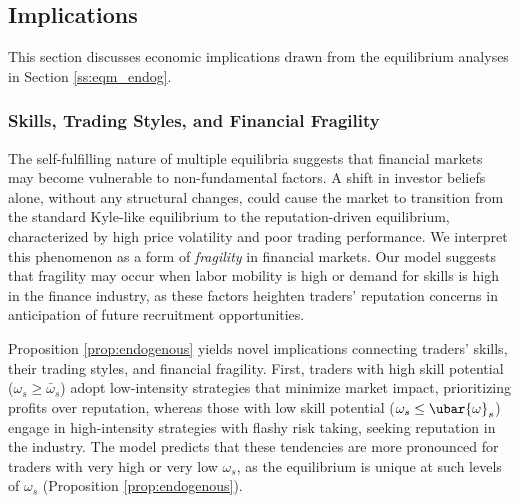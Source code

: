 \subsection{Implications}\label{ss:implications}
This section discusses economic implications drawn from the equilibrium analyses in Section \ref{ss:eqm_endog}.
\subsubsection{Skills, Trading Styles, and Financial Fragility}

The self-fulfilling nature of multiple equilibria suggests that financial markets may become vulnerable to non-fundamental factors. A shift in investor beliefs alone, without any structural changes, could cause the market to transition from the standard Kyle-like equilibrium to the reputation-driven equilibrium, characterized by high price volatility and poor trading performance.
We interpret this phenomenon as a form of \textit{fragility} in financial markets. Our model suggests that fragility may occur when labor mobility is high or demand for skills is high in the finance industry, as these factors heighten traders’ reputation concerns in anticipation of future recruitment opportunities. 

Proposition \ref{prop:endogenous} yields novel implications connecting traders' skills, their trading styles, and financial fragility. First, traders with high skill potential ($\omega_{s} \geq \bar{\omega}_{s}$) adopt low-intensity strategies that minimize market impact, prioritizing profits over reputation, whereas those with low skill potential ($\omega_{s} \leq \ubar{\omega}_{s}$) engage in high-intensity strategies with flashy risk taking, seeking reputation in the industry. The model predicts that these tendencies are more pronounced for traders with very high or very low $\omega_{s}$, as the equilibrium is unique at such levels of $\omega_{s}$ (Proposition \ref{prop:endogenous}). 

